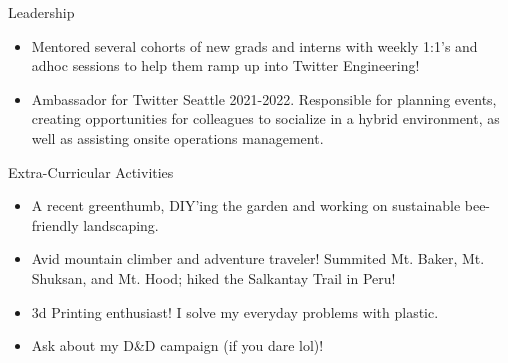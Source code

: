 \begin{rSection}{Leadership} 
    \begin{itemize}
        \item Mentored several cohorts of new grads and interns with weekly 1:1's and adhoc sessions to help them ramp up into Twitter Engineering!
        \item Ambassador for Twitter Seattle 2021-2022. Responsible for planning events, creating opportunities for colleagues to socialize in a hybrid environment, as well as assisting onsite operations management.
    \end{itemize}
\end{rSection}
\begin{rSection}{Extra-Curricular Activities} 
    \begin{itemize}
        \item A recent greenthumb, DIY'ing the garden and working on sustainable bee-friendly landscaping. 
        \item Avid mountain climber and adventure traveler! Summited Mt. Baker, Mt. Shuksan, and Mt. Hood; hiked the Salkantay Trail in Peru!
        \item 3d Printing enthusiast! I solve my everyday problems with plastic.
        \item Ask about my D\&D campaign (if you dare lol)!
    \end{itemize}
\end{rSection}


